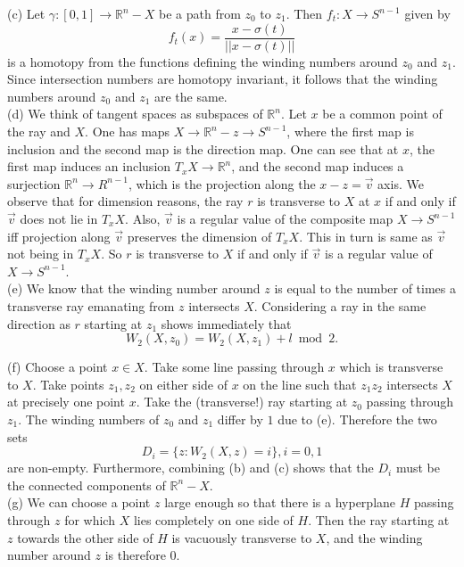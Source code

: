 \documentclass{amsart}
\numberwithin{equation}{section}
\theoremstyle{plain}
\theoremstyle{definition}
\theoremstyle{remark}
\renewcommand{\_}[2]{\underbrace{#1}_{#2}}
\renewcommand{\^}[2]{\overbrace{#1}_{#2}}
\newcommand{\R}{\mathbb{R}}
\begin{document}
(c) Let $\gamma:[0,1] \to \R^n - X$ be a path from $z_0$ to $z_1$. Then $f_t: X \to S^{n-1}$ given by \[f_t(x) = \frac{x - \sigma(t)}{||x-\sigma(t)||}\] is a homotopy from the functions defining the winding numbers around $z_0$ and $z_1$. Since intersection numbers are homotopy invariant, it follows that the winding numbers around $z_0$ and $z_1$ are the same.\\

(d) We think of tangent spaces as subspaces of $\R^n$. Let $x$ be a common point of the ray and $X$. One has maps $X \to \R^n - z \to S^{n-1}$, where the first map is inclusion and the second map is the direction map. One can see that at $x$, the first map induces an inclusion $T_xX \to \R^n$, and the second map induces a surjection $\R^n \to R^{n-1}$, which is the projection along the $x-z = \vec v$ axis. We observe that for dimension reasons, the ray $r$ is transverse to $X$ at $x$ if and only if $\vec v$ does not lie in $T_xX$. Also, $\vec v$ is a regular value of the composite map $X \to S^{n-1}$ iff projection along $\vec v$ preserves the dimension of $T_xX$. This in turn is same as $\vec v$ not being in $T_xX$. So $r$ is transverse to $X$ if and only if $\vec v$ is a regular value of $X \to S^{n-1}$. \\

(e) We know that the winding number around $z$ is equal to the number of times a transverse ray emanating from $z$ intersects $X$. Considering a ray in the same direction as $r$ starting at $z_1$ shows immediately that \[W_2(X,z_0) = W_2(X, z_1) + l\bmod 2.\] 

(f) Choose a point $x\in X$. Take some line passing through $x$ which is transverse to $X$. Take points $z_1, z_2$ on either side of $x$ on the line such that $z_1z_2$ intersects $X$ at precisely one point $x$. Take the (transverse!) ray starting at $z_0$ passing through $z_1$. The winding numbers of $z_0$ and $z_1$ differ by $1$ due to (e). Therefore the two sets \[D_i = \{z: W_2(X,z) = i\}, i = 0,1\] are non-empty. Furthermore, combining (b) and (c) shows that the $D_i$ must be the connected components of $\R^n - X$.\\

(g) We can choose a point $z$ large enough so that there is a hyperplane $H$ passing through $z$ for which $X$ lies completely on one side of $H$. Then the ray starting at $z$ towards the other side of $H$ is vacuously transverse to $X$, and the winding number around $z$ is therefore $0$.\\
\end{document}
